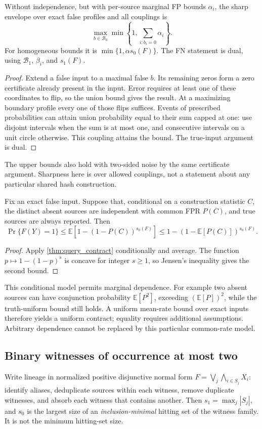 \documentclass[../main.tex]{subfiles}
\begin{document}
\begin{theorem}
\label{thm:dependent_contract}
Without independence, but with per-source marginal FP bounds $\alpha_i$,
the sharp envelope over exact false profiles and all couplings is
\[
 \max_{b\in\mathcal B_0}\min\left\{1,\sum_{i:b_i=0}\alpha_i\right\}.
\]
For homogeneous bounds it is $\min\{1,\alpha s_0(F)\}$. The FN statement
is dual, using $\mathcal B_1$, $\beta_i$, and $s_1(F)$.
\end{theorem}
\begin{proof}
Extend a false input to a maximal false $b$. Its remaining zeros form
a zero certificate already present in the input. Error requires at least
one of these coordinates to flip, so the union bound gives the result.
At a maximizing boundary profile every one of those flips suffices. Events
of prescribed probabilities can attain union probability equal to their
sum capped at one: use disjoint intervals when the sum is at most one,
and consecutive intervals on a unit circle otherwise. This coupling
attains the bound. The true-input argument is dual.
\end{proof}
The upper bounds also hold with two-sided noise by the same certificate
argument. Sharpness here is over allowed couplings, not a statement about
any particular shared hash construction.

\begin{corollary}
\label{cor:shared_rate}
Fix an exact false input. Suppose that, conditional on a construction
statistic $C$, the distinct absent sources are independent with common FPR
$P(C)$, and true sources are always reported. Then
\[
 \Pr\{F(Y)=1\}
 \leq\mathbb E[1-(1-P(C))^{s_0(F)}]
 \leq1-(1-\mathbb E[P(C)])^{s_0(F)}.
\]
\end{corollary}
\begin{proof}
Apply \cref{thm:query_contract} conditionally and average. The function
$p\mapsto1-(1-p)^s$ is concave for integer $s\geq1$, so Jensen's
inequality gives the second bound.
\end{proof}
This conditional model permits marginal dependence. For example two absent
sources can have conjunction probability $\mathbb E[P^2]$, exceeding
$(\mathbb E[P])^2$, while the truth-uniform bound still holds. A uniform
mean-rate bound over exact inputs therefore yields a uniform contract;
equality requires additional assumptions. Arbitrary dependence cannot be
replaced by this particular common-rate model.

\subsection{Binary witnesses of occurrence at most two}
Write lineage in normalized positive disjunctive normal form
$F=\bigvee_j\bigwedge_{i\in S_j}X_i$: identify aliases, deduplicate sources
within each witness, remove duplicate witnesses, and absorb each witness
that contains another. Then $s_1=\max_j|S_j|$, and $s_0$ is the largest
size of an \emph{inclusion-minimal} hitting set of the witness family.
It is not the minimum hitting-set size.
\end{document}
